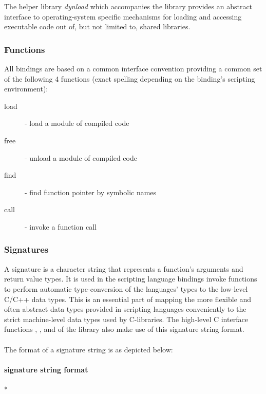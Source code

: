 The helper library \emph{dynload} which accompanies the 
library provides an abstract interface to operating-system specific mechanisms
for loading and accessing executable code out of, but not limited to, shared
libraries.

\subsubsection{Functions}

All bindings are based on a common interface convention providing a common set
of the following 4 functions (exact spelling depending on the binding's scripting
environment):
\begin{description}
\item [load] - load a module of compiled code
\item [free] - unload a module of compiled code
\item [find] - find function pointer by symbolic names
\item [call] - invoke a function call
\end{description}

\pagebreak

\subsubsection{Signatures}

A signature is a character string that represents a function's arguments and
return value types. It is used in the scripting language bindings invoke
functions to perform automatic type-conversion of the languages' types to the
low-level C/C++ data types. This is an essential part of mapping the more flexible
and often abstract data types provided in scripting languages conveniently to the
strict machine-level data types used by C-libraries.
The high-level C interface functions , ,
 and  of the  library also make
use of this signature string format.\\
\\
The format of a  signature string is as depicted below:


\paragraph{ signature string format}

\begin{center}
* \sigchar{)}  \\
\end{center}

